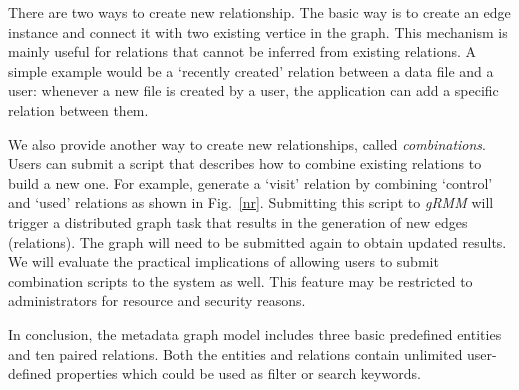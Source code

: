 There are two ways to create new relationship. The basic
way is to create an edge instance and connect it with
two existing vertice in the graph. This mechanism is mainly 
useful for relations that
cannot be inferred from existing relations. A simple example would be a
`recently created' relation between a data file and a user: whenever
a new file is created by a user, the application can add a specific
relation between them.

We also provide another way to create new relationships, called
\textit{combinations}. Users can submit a script that describes
how to combine existing relations to build a new one. For example,
generate a `visit' relation by combining `control' and `used'
relations as shown in Fig.~\ref{nr}. Submitting this script to 
\textit{gRMM} will trigger a distributed graph
task that results in the generation of new edges (relations).  The graph
will need to be submitted again to obtain updated results.
We will evaluate the practical implications of allowing users to submit
combination scripts to the system as well.  This feature may be restricted
to administrators for resource and security reasons.

In conclusion, the metadata graph model includes three basic predefined
entities and ten paired relations. Both the entities and relations contain unlimited user-defined properties which could be used as filter or search keywords.